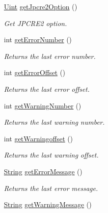 \begin{DoxyCompactItemize}
\hyperlink{namespacejpcre2_a078242d38221a13fb3543b9edd78c099}{Uint} \hyperlink{classjpcre2_1_1Regex_a5d2d04eb7c393338a4c8cce941e957ef_a5d2d04eb7c393338a4c8cce941e957ef}{get\+Jpcre2\+Option} ()
\begin{DoxyCompactList}\small\item\em Get J\+P\+C\+R\+E2 option. \end{DoxyCompactList}\item 
int \hyperlink{classjpcre2_1_1Regex_a7294273e7d11907a749f2db40da9ed15_a7294273e7d11907a749f2db40da9ed15}{get\+Error\+Number} ()
\begin{DoxyCompactList}\small\item\em Returns the last error number. \end{DoxyCompactList}\item 
int \hyperlink{classjpcre2_1_1Regex_ae8c6c8f728c58d9b171c68b4b166e195_ae8c6c8f728c58d9b171c68b4b166e195}{get\+Error\+Offset} ()
\begin{DoxyCompactList}\small\item\em Returns the last error offset. \end{DoxyCompactList}\item 
int \hyperlink{classjpcre2_1_1Regex_a6aa5722e52a154a1594ee6ea46e5d888_a6aa5722e52a154a1594ee6ea46e5d888}{get\+Warning\+Number} ()
\begin{DoxyCompactList}\small\item\em Returns the last warning number. \end{DoxyCompactList}\item 
int \hyperlink{classjpcre2_1_1Regex_a18dddb3eeedf5c61e0169770ffc9ab8f_a18dddb3eeedf5c61e0169770ffc9ab8f}{get\+Warningoffset} ()
\begin{DoxyCompactList}\small\item\em Returns the last warning offset. \end{DoxyCompactList}\item 
\hyperlink{namespacejpcre2_a91f03070152fb228bc116c5a737f1d16}{String} \hyperlink{classjpcre2_1_1Regex_a8606fff8b192c94f58ca9e82aa048c61_a8606fff8b192c94f58ca9e82aa048c61}{get\+Error\+Message} ()
\begin{DoxyCompactList}\small\item\em Returns the last error message. \end{DoxyCompactList}\item 
\hyperlink{namespacejpcre2_a91f03070152fb228bc116c5a737f1d16}{String} \hyperlink{classjpcre2_1_1Regex_a1a639ae4090b88609c03e9268faf02d8_a1a639ae4090b88609c03e9268faf02d8}{get\+Warning\+Message} ()

\end{DoxyCompactItemize}
